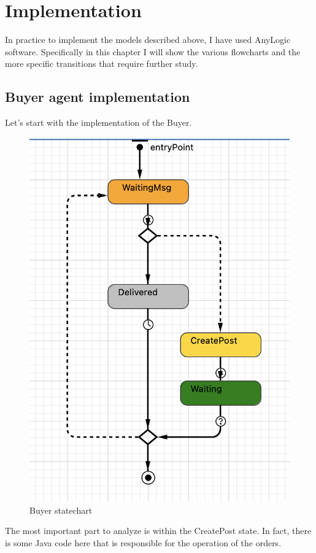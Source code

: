 \chapter{Implementation}\label{ch:implementation}
In practice to implement the models described above, I have used AnyLogic software.
Specifically in this chapter I will show the various flowcharts and the more specific transitions that require further study.
\section{Buyer agent implementation}
Let's start with the implementation of the Buyer.
\begin{figure}[hbtp]
\caption{Buyer statechart}
\centering
\includegraphics[scale=0.4]{../Images/buyerstatechart.png}
\end{figure}
The most important part to analyze is within the CreatePost state. In fact, there is some Java code here that is responsible for the operation of the orders.
